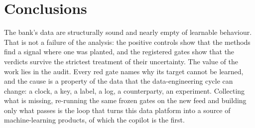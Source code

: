 \section{Conclusions}\label{sec:cc-conclusions}

The bank's data are structurally sound and nearly empty of learnable behaviour. That is not a failure of the analysis:
the positive controls show that the methods find a signal where one was planted, and the registered gates show that the
verdicts survive the strictest treatment of their uncertainty. The value of the work lies in the audit. Every red gate
names why its target cannot be learned, and the cause is a property of the data that the data-engineering cycle can
change: a clock, a key, a label, a log, a counterparty, an experiment. Collecting what is missing, re-running the same
frozen gates on the new feed and building only what passes is the loop that turns this data platform into a source of
machine-learning products, of which the copilot is the first.
